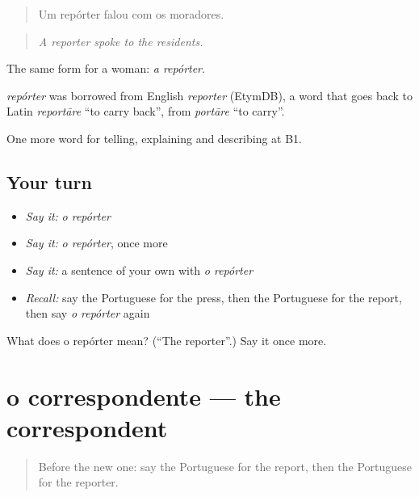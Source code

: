 \begin{quote}
Um repórter falou com os moradores.
\end{quote}

\begin{quote}
\emph{A reporter spoke to the residents.}
\end{quote}

The same form for a woman: \emph{a repórter}.

\begin{cousinweb}
\emph{repórter} was borrowed from English \emph{reporter} (EtymDB), a word that goes back to Latin \emph{reportāre} \textquotedblleft{}to carry back\textquotedblright{}, from \emph{portāre} \textquotedblleft{}to carry\textquotedblright{}.
\end{cousinweb}

\begin{grammarlens}[title={What you've built}]
One more word for telling, explaining and describing at B1.
\end{grammarlens}

\subsection*{Your turn}
\begin{itemize}
\raggedright
  \item \emph{Say it:} \emph{o repórter}
  \item \emph{Say it:} \emph{o repórter}, once more
  \item \emph{Say it:} a sentence of your own with \emph{o repórter}
  \item \emph{Recall:} say the Portuguese for the press, then the Portuguese for the report, then say \emph{o repórter} again
\end{itemize}

\begin{tcolorbox}[breakable,colback=teal!4,colframe=teal!35!black,title={Before you move on}]
What does o repórter mean? (\textquotedblleft{}The reporter\textquotedblright{}.) Say it once more.
\end{tcolorbox}
\section[o correspondente]{o correspondente — the correspondent}

\label{lesson:PT-C279-correspondente}



\begin{quote}
Before the new one: say the Portuguese for the report, then the Portuguese for the reporter.
\end{quote}

